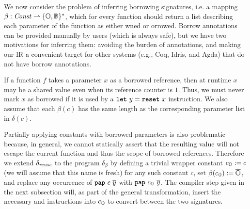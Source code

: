 \label{sec:beta}
We now consider the problem of inferring borrowing signatures, i.e. a mapping
$\beta : \mathit{Const} \rightharpoonup \{\mathbb{O}{}, \mathbb{B}{}\}^*$, which for every
function should return a list describing each parameter of the function as
either \own{}{}wned or \bor{}{}orrowed.
Borrow annotations can be provided manually by users (which is always safe), but we have two motivations
for inferring them: avoiding the burden of annotations, and making our IR a convenient target
for other systems (e.g., Coq, Idris, and Agda) that do not have borrow annotations.

If a function $f$ takes a parameter $x$ as a borrowed reference, then
at runtime $x$ may be a shared value even when its reference counter
is $1$. Thus, we must never mark $x$ as borrowed if it is used by
a $\texttt{\textbf{let}}\ y = \texttt{\textbf{reset}}\ x$ instruction. We also assume that
each $\beta(c)$ has the same length as the corresponding parameter
list in $\delta(c)$.

Partially applying constants with borrowed parameters is also
problematic because, in general, we cannot statically assert that the
resulting value will not escape the current function and thus the
scope of borrowed references. Therefore we extend $\delta_{\textit{reuse}}$ to
the program $\delta_\beta$ by defining a trivial wrapper
constant $c_{\mathbb{O}}{} := c$ (we will assume that this name is fresh) for any
such constant $c$, set $\beta(c_{\mathbb{O}}{}) := \overline{\mathbb{O}{}}$, and replace any
occurrence of $\texttt{\textbf{pap}}\ c\ \overline{y}$ with $\texttt{\textbf{pap}}\ c_{\mathbb{O}}{}\ \overline{y}$.
The compiler step given in the next subsection will,
as part of the general transformation,
insert the necessary  and  instructions into
$c_{\mathbb{O}}{}$ to convert between the two signatures.

